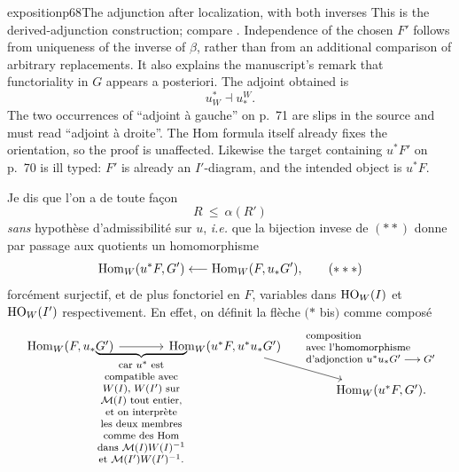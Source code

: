 \begin{dcomment}{exposition}{p68}{The adjunction after localization, with both inverses}
This is the derived-adjunction construction; compare \citet[Lemma 1.3.10]{Hovey1999}. Independence of the chosen $F'$ follows from uniqueness of the inverse of $\beta$, rather than from an additional comparison of arbitrary replacements. It also explains the manuscript's remark that functoriality in $G$ appears a posteriori. The adjoint obtained is
\[
                                u_W^*\dashv u_*^W.
\]
The two occurrences of ``adjoint \`a gauche'' on p.~71 are slips in the source and must read ``adjoint \`a droite''. The Hom formula itself already fixes the orientation, so the proof is unaffected. Likewise the target containing $u^*F'$ on p.~70 is ill typed: $F'$ is already an $I'$-diagram, and the intended object is $u^*F$.
\end{dcomment}


Je dis que l'on a de toute façon
\[
R \ \leq \ \alpha(R')
\]
\textit{sans} hypothèse d'admissibilité sur $u$, \textit{i.e.} que la bijection invese de $(**)$ donne par passage aux quotients un homomorphisme %
\[
\mathrm{Hom}_W(u^*F, G') \longleftarrow \mathrm{Hom}_W(F, u_*G'), \tag*{$(***)$}
\]
forcément surjectif, et de plus fonctoriel en $F$, variables dans $\mathrm{HO}_W(I)$ et $\mathrm{HO}_W(I')$ respectivement. En effet, on définit la flèche $(*$ bis$)$ comme composé
\[
\begin{tikzcd}[column sep=large]
\Hom_W(F, u_*G') \arrow[r, "\underbrace{\hspace{2.6cm}}_{\text{\footnotesize\begin{tabular}{@{}c@{}}car $u^*$ est\\ compatible avec\\ $W(I)$, $W(I')$ sur\\ $\cM(I)$ tout entier,\\ et on interprète\\ les deux membres\\ comme des Hom\\ dans $\cM(I)W(I)^{-1}$\\ et $\cM(I')W(I')^{-1}$.\end{tabular}}}"'] & \Hom_W(u^*F, u^*u_*G') \arrow[dr, "\text{\footnotesize\begin{tabular}{@{}l@{}}composition\\ avec l'homomorphisme\\ d'adjonction $u^*u_*G' \longrightarrow G'$\end{tabular}}"] & \\
 & & \Hom_W(u^*F, G').
\end{tikzcd}
\]

